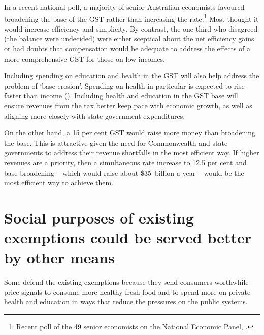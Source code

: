 In a recent national poll, a majority of senior Australian economists favoured broadening the base of the GST rather than increasing the rate.\footnote{Recent poll of the 49 senior economists on the National Economic Panel, \textcite{NationalEconomicSocietyAustralia2015-GST}.}  Most thought it would increase efficiency and simplicity. By contrast, the one third who disagreed (the balance were undecided) were either sceptical about the net efficiency gains or had doubts that compensation would be adequate to address the effects of a more comprehensive GST for those on low incomes.

Including spending on education and health in the GST will also help address the problem of ‘base erosion’. Spending on health in particular is expected to rise faster than income (). Including health and education in the GST base will ensure revenues from the tax better keep pace with economic growth, as well as aligning more closely with state government expenditures. 

On the other hand, a 15 per cent GST would raise more money than broadening the base. This is attractive given the need for Commonwealth and state governments to address their revenue shortfalls in the most efficient way. If higher revenues are a priority, then a simultaneous rate increase to 12.5 per cent and base broadening – which would raise about \$35~billion a year – would be the most efficient way to achieve them. 

\section{Social purposes of existing exemptions could be served better by other means\label{sec:GST-2-4}}
Some defend the existing exemptions because they send consumers worthwhile price signals to consume more healthy fresh food and to spend more on private health and education in ways that reduce the pressures on the public systems. 

